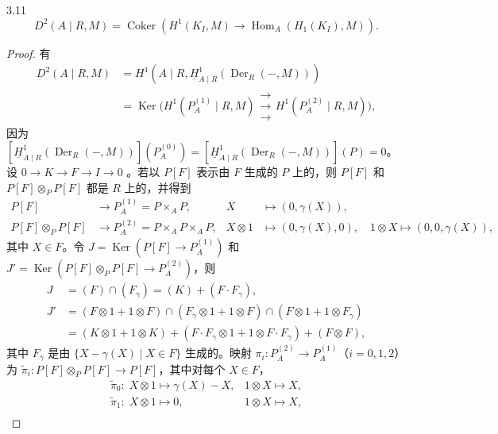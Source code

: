 \begin{SGAresult}{}{3.11}
\[D^2(A\mid R,M)=\operatorname{Coker}(H^1(K_I,M)\to\operatorname{Hom}_A(H_1(K_I),M)).\]
\end{SGAresult}
\begin{proof}
有
\[
\begin{aligned}
D^2(A\mid R,M)&=H^1(A\mid R,\underline H^1_{A\mid R}(\operatorname{Der}_R(-,M)))\\
&=\operatorname{Ker}\bigl(H^1(P_A^{(1)}\mid R,M)\mathrel{\substack{\longrightarrow\\[-.7ex]\longrightarrow\\[-.7ex]\longrightarrow}}H^1(P_A^{(2)}\mid R,M)\bigr),
\end{aligned}
\]
因为 $[\underline H^1_{A\mid R}(\operatorname{Der}_R(-,M))](P_A^{(0)})=[\underline H^1_{A\mid R}(\operatorname{Der}_R(-,M))](P)=0$。
设 $0\to K\to F\to I\to0$ 。若以 $P[F]$ 表示由 $F$ 生成的 $P$ 上的，则 $P[F]$ 和 $P[F]\otimes_P P[F]$ 都是 $R$ 上的，并得到
\[
\begin{aligned}
P[F]&\longrightarrow P_A^{(1)}=P\mathbin{\times_A}P,&X&\longmapsto(0,\gamma(X)),\\
P[F]\otimes_P P[F]&\longrightarrow P_A^{(2)}=P\mathbin{\times_A}P\mathbin{\times_A}P,
&X\otimes1&\longmapsto(0,\gamma(X),0),\quad1\otimes X\longmapsto(0,0,\gamma(X)),
\end{aligned}
\]
其中 $X\in F$。令 $J=\operatorname{Ker}(P[F]\to P_A^{(1)})$ 和 $J'=\operatorname{Ker}(P[F]\otimes_P P[F]\to P_A^{(2)})$，则
\[
\begin{aligned}
J&=(F)\cap(F_\gamma)=(K)+(F\cdot F_\gamma),\\
J'&=(F\otimes1+1\otimes F)\cap(F_\gamma\otimes1+1\otimes F)\cap(F\otimes1+1\otimes F_\gamma)\\
&=(K\otimes1+1\otimes K)+(F\cdot F_\gamma\otimes1+1\otimes F\cdot F_\gamma)+(F\otimes F),
\end{aligned}
\]
其中 $F_\gamma$ 是由 $\{X-\gamma(X)\mid X\in F\}$ 生成的。映射 $\pi_i:P_A^{(2)}\to P_A^{(1)}$（$i=0,1,2$）为 $\widetilde\pi_i:P[F]\otimes_P P[F]\to P[F]$，其中对每个 $X\in F$，
\[
\begin{array}{ll}
\widetilde\pi_0:\;X\otimes1\mapsto\gamma(X)-X,&1\otimes X\mapsto X,\\
\widetilde\pi_1:\;X\otimes1\mapsto0,&1\otimes X\mapsto X,\\

\end{array}\]
\end{proof}
